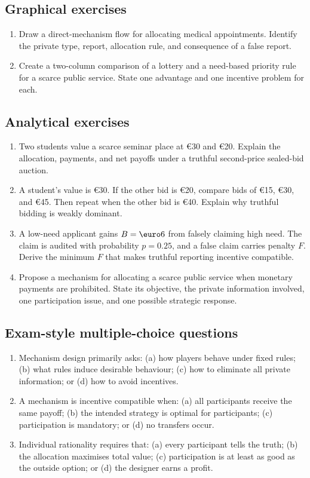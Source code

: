 \subsection*{Graphical exercises}
\begin{enumerate}[resume,label=\arabic*.]
  \item Draw a direct-mechanism flow for allocating medical appointments. Identify the private type, report, allocation rule, and consequence of a false report.
  \item Create a two-column comparison of a lottery and a need-based priority rule for a scarce public service. State one advantage and one incentive problem for each.
\end{enumerate}

\subsection*{Analytical exercises}
\begin{enumerate}[resume,label=\arabic*.]
  \item Two students value a scarce seminar place at \euro30 and \euro20. Explain the allocation, payments, and net payoffs under a truthful second-price sealed-bid auction.
  \item A student's value is \euro30. If the other bid is \euro20, compare bids of \euro15, \euro30, and \euro45. Then repeat when the other bid is \euro40. Explain why truthful bidding is weakly dominant.
  \item A low-need applicant gains \(B=\text{\euro6}\) from falsely claiming high need. The claim is audited with probability \(p=0.25\), and a false claim carries penalty \(F\). Derive the minimum \(F\) that makes truthful reporting incentive compatible.
  \item Propose a mechanism for allocating a scarce public service when monetary payments are prohibited. State its objective, the private information involved, one participation issue, and one possible strategic response.
\end{enumerate}

\subsection*{Exam-style multiple-choice questions}
\begin{enumerate}[resume,label=\arabic*.]
  \item Mechanism design primarily asks: (a) how players behave under fixed rules; (b) what rules induce desirable behaviour; (c) how to eliminate all private information; or (d) how to avoid incentives.
  \item A mechanism is incentive compatible when: (a) all participants receive the same payoff; (b) the intended strategy is optimal for participants; (c) participation is mandatory; or (d) no transfers occur.
  \item Individual rationality requires that: (a) every participant tells the truth; (b) the allocation maximises total value; (c) participation is at least as good as the outside option; or (d) the designer earns a profit.
\end{enumerate}

